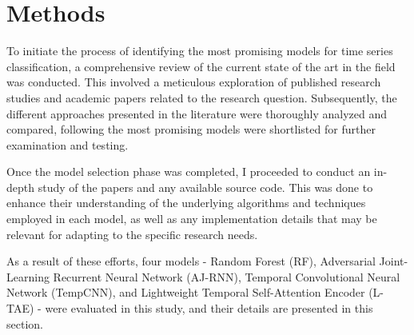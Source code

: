 \chapter{Methods}
To initiate the process of identifying the most promising models for time series classification, a comprehensive review of the current state of the art in the field was conducted.
This involved a meticulous exploration of published research studies and academic papers related to the research question.
Subsequently, the different approaches presented in the literature were thoroughly analyzed and compared, following the most promising models were shortlisted for further examination and testing.

Once the model selection phase was completed, I proceeded to conduct an in-depth study of the papers and any available source code.
This was done to enhance their understanding of the underlying algorithms and techniques employed in each model, as well as any implementation details that may be relevant for adapting to the specific research needs.

As a result of these efforts, four models - Random Forest (RF), Adversarial Joint-Learning Recurrent Neural Network (AJ-RNN), Temporal Convolutional Neural Network (TempCNN), and Lightweight Temporal Self-Attention Encoder (L-TAE) - were evaluated in this study, and their details are presented in this section.



\pagebreak

\pagebreak

\pagebreak

\pagebreak